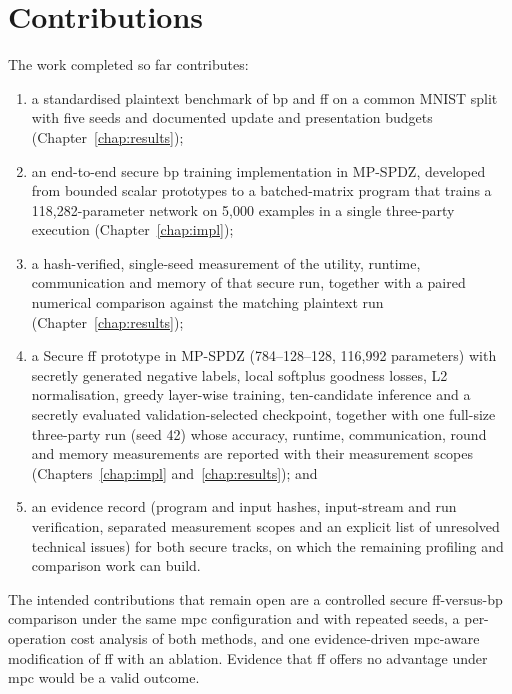 \section{Contributions}\label{sec:intro-contrib}
The work completed so far contributes:
\begin{enumerate}
  \item a standardised plaintext benchmark of \ac{bp} and \ac{ff} on a common MNIST split with five seeds and documented update and presentation budgets (Chapter~\ref{chap:results});
  \item an end-to-end secure \ac{bp} training implementation in MP-SPDZ, developed from bounded scalar prototypes to a batched-matrix program that trains a 118{,}282-parameter network on 5{,}000 examples in a single three-party execution (Chapter~\ref{chap:impl});
  \item a hash-verified, single-seed measurement of the utility, runtime, communication and memory of that secure run, together with a paired numerical comparison against the matching plaintext run (Chapter~\ref{chap:results});
  \item a Secure \ac{ff} prototype in MP-SPDZ (784--128--128, 116{,}992 parameters) with secretly generated negative labels, local softplus goodness losses, L2 normalisation, greedy layer-wise training, ten-candidate inference and a secretly evaluated validation-selected checkpoint, together with one full-size three-party run (seed 42) whose accuracy, runtime, communication, round and memory measurements are reported with their measurement scopes (Chapters~\ref{chap:impl} and~\ref{chap:results}); and
  \item an evidence record (program and input hashes, input-stream and run verification, separated measurement scopes and an explicit list of unresolved technical issues) for both secure tracks, on which the remaining profiling and comparison work can build.
\end{enumerate}
The intended contributions that remain open are a controlled secure \ac{ff}-versus-\ac{bp} comparison under the same \ac{mpc} configuration and with repeated seeds, a per-operation cost analysis of both methods, and one evidence-driven \ac{mpc}-aware modification of \ac{ff} with an ablation. Evidence that \ac{ff} offers no advantage under \ac{mpc} would be a valid outcome.

